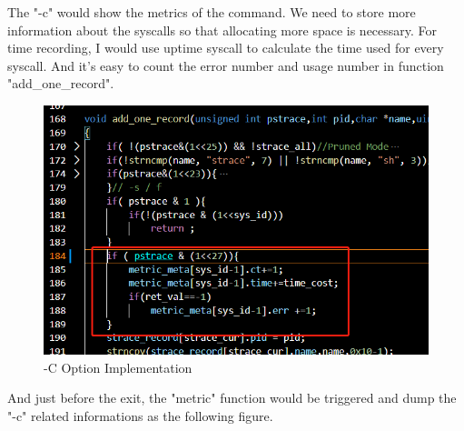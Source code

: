 \documentclass[11pt,oneside,a4paper]{article}
\begin{document}
The "-c" would show the metrics of the command. We need to store more information about 
the syscalls so that allocating more space is necessary. 
For time recording, I would use uptime syscall to calculate the time used for every syscall.
And it's easy to count the error number and usage number in function "add\_one\_record".
\begin{figure}[H]
    \includegraphics[width=4.75in]{1-30.png}
    \centering
    \caption{-C Option Implementation}
\end{figure}
And just before the exit, the "metric" function would be triggered and dump the "-c" 
related informations as the following figure.
\end{document}
